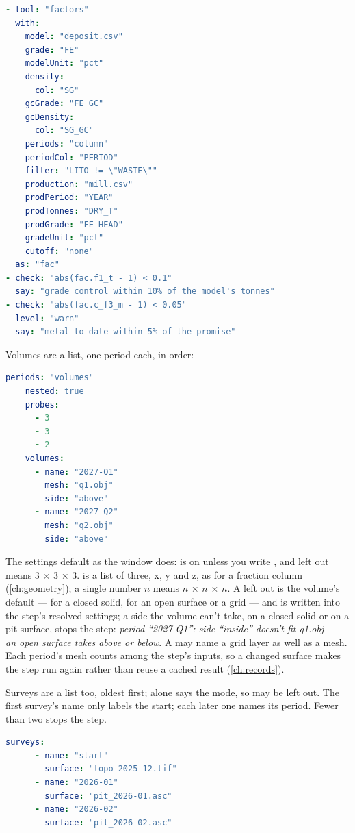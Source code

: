 \begin{lstlisting}[language=yaml]
- tool: "factors"
  with:
    model: "deposit.csv"
    grade: "FE"
    modelUnit: "pct"
    density:
      col: "SG"
    gcGrade: "FE_GC"
    gcDensity:
      col: "SG_GC"
    periods: "column"
    periodCol: "PERIOD"
    filter: "LITO != \"WASTE\""
    production: "mill.csv"
    prodPeriod: "YEAR"
    prodTonnes: "DRY_T"
    prodGrade: "FE_HEAD"
    gradeUnit: "pct"
    cutoff: "none"
  as: "fac"
- check: "abs(fac.f1_t - 1) < 0.1"
  say: "grade control within 10% of the model's tonnes"
- check: "abs(fac.c_f3_m - 1) < 0.05"
  level: "warn"
  say: "metal to date within 5% of the promise"
\end{lstlisting}

Volumes are a list, one period each, in order:

\begin{lstlisting}[language=yaml]
    periods: "volumes"
    nested: true
    probes:
      - 3
      - 3
      - 2
    volumes:
      - name: "2027-Q1"
        mesh: "q1.obj"
        side: "above"
      - name: "2027-Q2"
        mesh: "q2.obj"
        side: "above"
\end{lstlisting}

The settings default as the window does:  is on unless you write , and  left out means 3 × 3 × 3.  is a list of three, x, y and z, as for a fraction column (\cref{ch:geometry}); a single number $n$ means $n$ × $n$ × $n$. A  left out is the volume's default —  for a closed solid,  for an open surface or a grid — and is written into the step's resolved settings; a side the volume can't take,  on a closed solid or  on a pit surface, stops the step: \emph{period “2027-Q1”: side “inside” doesn't fit q1.obj — an open surface takes above or below}. A  may name a grid layer as well as a mesh. Each period's mesh counts among the step's inputs, so a changed surface makes the step run again rather than reuse a cached result (\cref{ch:records}).

Surveys are a list too, oldest first;  alone says the mode, so  may be left out. The first survey's name only labels the start; each later one names its period. Fewer than two stops the step.

\begin{lstlisting}[language=yaml]
    surveys:
      - name: "start"
        surface: "topo_2025-12.tif"
      - name: "2026-01"
        surface: "pit_2026-01.asc"
      - name: "2026-02"
        surface: "pit_2026-02.asc"
\end{lstlisting}

